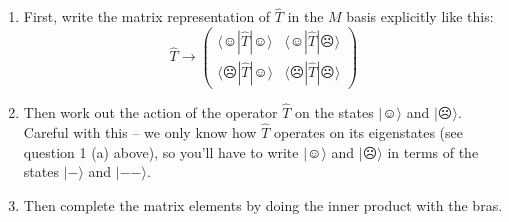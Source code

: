 \documentclass[10pt, letterpaper, twoside, openany]{article}
\newcommand{\ket}[1]{| #1 \rangle}
\newcommand{\bra}[1]{\langle #1 |}
\begin{document}
\begin{enumerate}
\begin{enumerate}
\item First, write the matrix representation of $\hat{T}$ in the $M$ basis explicitly like this:
\[
\hat{T} \to \begin{pmatrix}
\bra{☺}\hat{T}\ket{☺} & \bra{☺}\hat{T}\ket{☹} \\
\bra{☹}\hat{T}\ket{☺} & \bra{☹}\hat{T}\ket{☹}
\end{pmatrix}
\]
\item Then work out the action of the operator $\hat{T}$ on the states $\ket{☺}$ and $\ket{☹}$.  Careful with this -- we only know how $\hat{T}$ operates on its eigenstates (see question 1 (a) above), so you'll have to write $\ket{☺}$ and $\ket{☹}$ in terms of the states $\ket{-}$ and $\ket{--}$.
\item Then complete the matrix elements by doing the inner product with the bras.  
\end{enumerate}

\end{enumerate}
\end{document}
